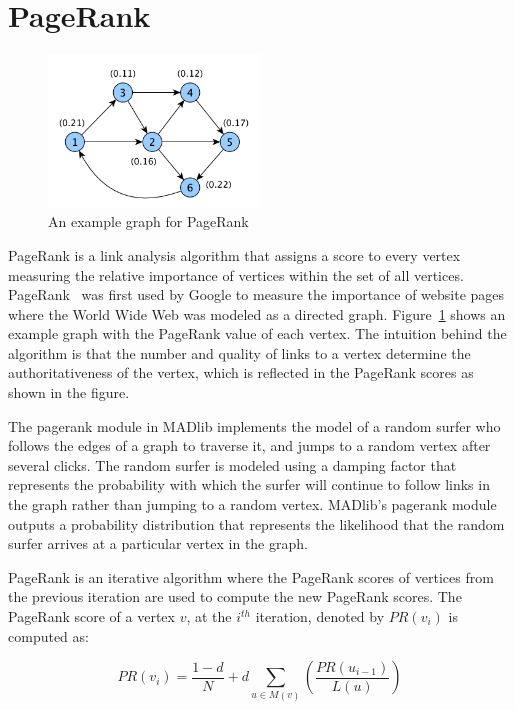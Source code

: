 \section{PageRank} \label{sec:graph:pagerank}
\begin{figure}[h]
    \centering
    \includegraphics[width=0.5\textwidth]{figures/pagerank_example.pdf}
\caption{An example graph for PageRank}
\label{pagerank:example}
\end{figure}

PageRank is a link analysis algorithm that assigns a score to every vertex
measuring the relative importance of vertices within the set of all
vertices. PageRank~\cite{pagerank} was first used by Google to measure the
importance of website pages where the World Wide Web was modeled as a directed
graph. Figure~\ref{pagerank:example} shows an example graph with the PageRank
value of each vertex. The intuition behind the algorithm is that the number and
quality of links to a vertex determine the authoritativeness of the vertex,
which is reflected in the PageRank scores as shown in the figure.

The pagerank module in MADlib implements the model of a random surfer who
follows the edges of a graph to traverse it, and jumps to a random vertex
after several clicks. The random surfer is modeled using a damping factor
that represents the probability with which the surfer will continue to follow
links in the graph rather than jumping to a random vertex. MADlib's pagerank
module outputs a probability distribution that represents the likelihood that
the random surfer arrives at a particular vertex in the graph.

PageRank is an iterative algorithm where the PageRank scores of vertices from
the previous iteration are used to compute the new PageRank scores. The
PageRank score of a vertex $v$, at the $i^{th}$ iteration, denoted by $PR(v_i)$
is computed as:

\begin{equation}
PR(v_i) = \frac{1-d}{N} + d \sum_{u \in M(v)}(\frac{PR(u_{i-1})}{L(u)})
\label{eq:pagerank}
\end{equation}

